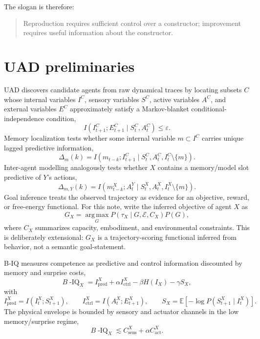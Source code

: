 \documentclass[11pt]{article}
\newcommand{\E}{\mathbb{E}}
\newcommand{\Biq}{B\!\operatorname{-IQ}}
\newcommand{\MI}{I}
\newcommand{\argmax}{\operatorname*{arg\,max}}
\begin{document}
The slogan is therefore:
\begin{quote}
Reproduction requires sufficient control over a constructor; improvement requires useful information about the constructor.
\end{quote}

\section{UAD preliminaries}

UAD discovers candidate agents from raw dynamical traces by locating subsets $C$ whose internal variables $I^C$, sensory variables $S^C$, active variables $A^C$, and external variables $E^C$ approximately satisfy a Markov-blanket conditional-independence condition,
\begin{equation}
  \MI(I^C_{t+1};E^C_{t+1}\mid S^C_t,A^C_t) \le \varepsilon .
\end{equation}
Memory localization tests whether some internal variable $m\subset I^C$ carries unique lagged predictive information,
\begin{equation}
  \Delta_m(k)=\MI(m_{t-k};I^C_{t+1}\mid S^C_t,A^C_t,I^C_t\setminus \{m\}).
\end{equation}
Inter-agent modelling analogously tests whether $X$ contains a memory/model slot predictive of $Y$'s actions,
\begin{equation}
  \Delta_{m,Y}(k)=\MI(m^X_{t-k};A^Y_t\mid S^X_t,A^X_t,I^X_t\setminus\{m\}).
\end{equation}
Goal inference treats the observed trajectory as evidence for an objective, reward, or free-energy functional. For this note, write the inferred objective of agent $X$ as
\begin{equation}
  G_X = \argmax_G P(\tau_X\mid G,\mathcal E,C_X)P(G),
\end{equation}
where $C_X$ summarizes capacity, embodiment, and environmental constraints. This is deliberately extensional: $G_X$ is a trajectory-scoring functional inferred from behavior, not a semantic goal-statement.

B-IQ measures competence as predictive and control information discounted by memory and surprise costs,
\begin{equation}
  \Biq_X = I_{\mathrm{pred}}^X+\alpha I_{\mathrm{ctrl}}^X-\beta H(I_X)-\gamma S_X,
\end{equation}
with
\begin{equation}
  I_{\mathrm{pred}}^X=\MI(I^X_t;S^X_{t+1}),\qquad
  I_{\mathrm{ctrl}}^X=\MI(A^X_t;E^X_{t+1}),\qquad
  S_X=\E[-\log P(S^X_{t+1}\mid I^X_t)].
\end{equation}
The physical envelope is bounded by sensory and actuator channels in the low memory/surprise regime,
\begin{equation}
  \Biq_X \lesssim C_{\mathrm{sens}}^X+\alpha C_{\mathrm{act}}^X.
\end{equation}
\end{document}
